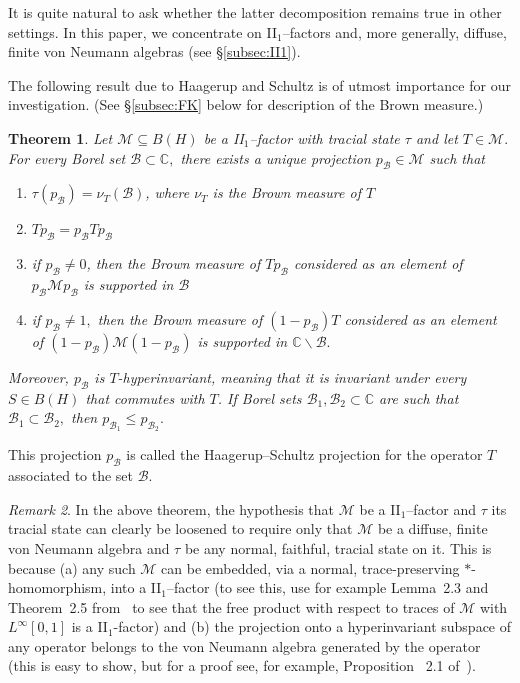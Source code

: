 \documentclass{amsart}
\theoremstyle{plain}
\newtheorem{thm}{Theorem}
\theoremstyle{remark}
\newtheorem{rem}[thm]{Remark}
\begin{document}
It is quite natural to ask whether the latter decomposition remains true in other settings.
In this paper, we concentrate on II$_1$--factors and, more generally, diffuse, finite von Neumann algebras
(see \S\ref{subsec:II1}).

The following result due to Haagerup and Schultz
\cite{HS2} is of utmost importance for our investigation.
(See \S\ref{subsec:FK} below for description of the Brown measure.)

\begin{thm}\label{thm:HS} Let $\mathcal{M}\subseteq B(H)$ be a II$_1$--factor with tracial state $\tau$
and let $T\in\mathcal{M}.$ For every Borel set $\mathcal{B}\subset\mathbb{C},$ there exists a unique projection $p_{\mathcal{B}}\in\mathcal{M}$ such that
\begin{enumerate}[{\rm (a)}]
\item\label{hsa} $\tau(p_{\mathcal{B}})=\nu_T(\mathcal{B})$, where $\nu_T$ is the Brown measure of $T$
\item\label{hsb} $Tp_{\mathcal{B}}=p_{\mathcal{B}}Tp_{\mathcal{B}}$
\item\label{hsc} if $p_{\mathcal{B}}\ne0$, then the Brown measure of $Tp_{\mathcal{B}}$ considered as an element of $p_{\mathcal{B}}\mathcal{M}p_{\mathcal{B}}$ is supported in $\mathcal{B}$
\item\label{hsd} if $p_{\mathcal{B}}\ne1,$ then the Brown measure of $(1-p_{\mathcal{B}})T$ considered as an element of $(1-p_{\mathcal{B}})\mathcal{M}(1-p_{\mathcal{B}})$ is supported in $\mathbb{C}\backslash\mathcal{B}.$
\end{enumerate}
Moreover, $p_{\mathcal{B}}$ is $T$-hyperinvariant, meaning that it is invariant under every $S\in B(H)$ that commutes with $T$.
If Borel sets $\mathcal{B}_1,\mathcal{B}_2\subset\mathbb{C}$ are such that $\mathcal{B}_1\subset\mathcal{B}_2,$ then $p_{\mathcal{B}_1}\leq p_{\mathcal{B}_2}.$
\end{thm}

This projection $p_{\mathcal{B}}$ is called the Haagerup--Schultz projection for the operator $T$ associated to the set $\mathcal{B}$.

\begin{rem}
In the above theorem, the hypothesis that $\mathcal{M}$ be a II$_1$--factor and $\tau$ its tracial state
can clearly be loosened to require only that
$\mathcal{M}$ be a diffuse, finite von Neumann algebra and $\tau$ be any normal, faithful, tracial state on it.
This is because (a) any such $\mathcal{M}$ can be embedded, via a normal, trace-preserving $*$-homomorphism, into a II$_1$--factor
(to see this, use for example Lemma~2.3 and Theorem~2.5 from~\cite{D94} to see that the free product
with respect to traces of $\mathcal{M}$ with $L^\infty[0,1]$ is a II$_1$-factor)
and (b) the projection onto a hyperinvariant subspace of any operator belongs to the von Neumann algebra generated by the operator
(this is easy to show, but for a proof see, for example, Proposition~ 2.1 of~\cite{D05}).
\end{rem}
\end{document}
